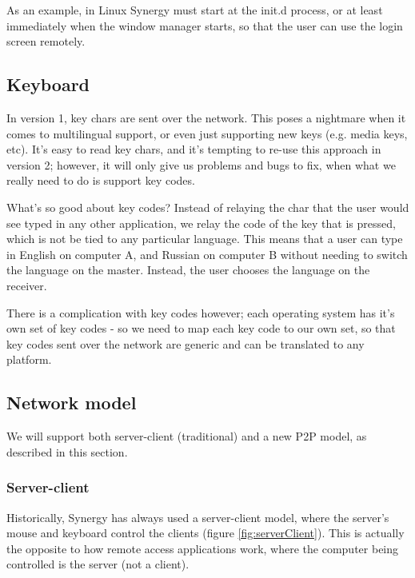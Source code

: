 As an example, in Linux Synergy 
must start at the init.d process, or at least immediately when the window 
manager starts, so that the user can use the login screen remotely.

\subsection{Keyboard}

 
In version 1, key chars are sent over the network. This poses a nightmare when
it comes to multilingual support, or even just supporting new keys (e.g. media
keys, etc). It's easy to read key chars, and it's tempting to re-use this 
approach in version 2; however, it will only give us problems and bugs to fix,
when what we really need to do is support key codes.

What's so good about key codes? Instead of relaying the char that the user would
see typed in any other application, we relay the code of the key that is 
pressed, which is not be tied to any particular language. This means that a user
can type in English on computer A, and Russian on computer B without needing to
switch the language on the master. Instead, the user chooses the language on
the receiver.

There is a complication with key codes however; each operating system has it's
own set of key codes - so we need to map each key code to our own set, so that
key codes sent over the network are generic and can be translated to any 
platform.

\subsection{Network model}

We will support both server-client (traditional) and a new P2P model, as
described in this section.

\subsubsection{Server-client}

Historically, Synergy has always used a server-client model, where the server's
mouse and keyboard control the clients (figure \ref{fig:serverClient}). This is
actually the opposite to how remote access applications work, where the computer
being controlled is the server (not a client).

